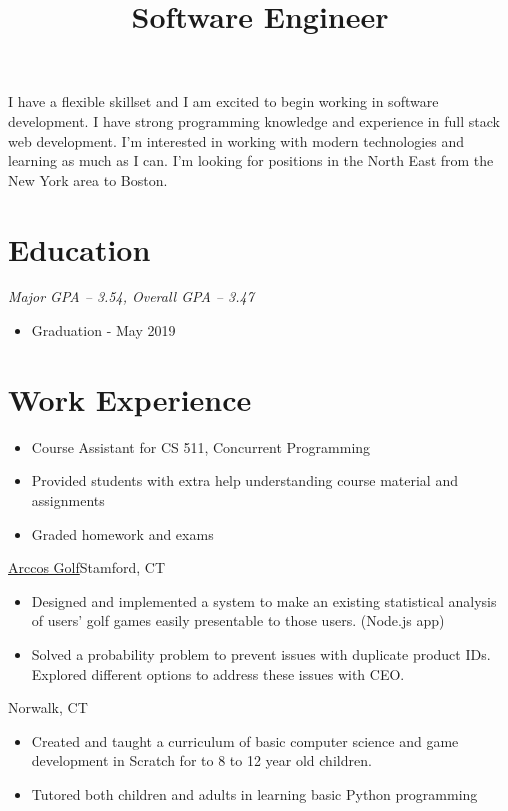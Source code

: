 \documentclass[11pt,letterpaper,roman]{moderncv}
\title{Software Engineer}
\begin{document}
\makecvtitle
\vspace*{-5mm}


{
    I have a flexible skillset and I am excited to begin working in software development.
    I have strong programming knowledge and experience in full stack web development. 
    I'm interested in working with modern technologies and learning as much as I can. 
    I'm looking for positions in the North East from the New York area to Boston.
}

\section{Education}
{
    \textit{Major GPA -- 3.54, Overall GPA -- 3.47}
    \begin{itemize}
        \item Graduation - May 2019
    \end{itemize}
}

\section{Work Experience}
{
    \begin{itemize}
        \item Course Assistant for CS 511, Concurrent Programming
        \item Provided students with extra help understanding course material and assignments
        \item Graded homework and exams
    \end{itemize}
}
{\href{http://www.arccosgolf.com/}{Arccos Golf}}{Stamford, CT}{}
{
    \begin{itemize}
        \item Designed and implemented a system to make an existing statistical analysis of users'
              golf games easily presentable to those users. (Node.js app)
        \item Solved a probability problem to prevent issues with duplicate product IDs.
              Explored different options to address these issues with CEO.
    \end{itemize}
}
{Norwalk, CT}{}
{
    \begin{itemize}
        \item Created and taught a curriculum of basic computer science and game development in
              Scratch for to 8 to 12 year old children.
        \item Tutored both children and adults in learning basic Python programming
    \end{itemize}
}
\end{document}

